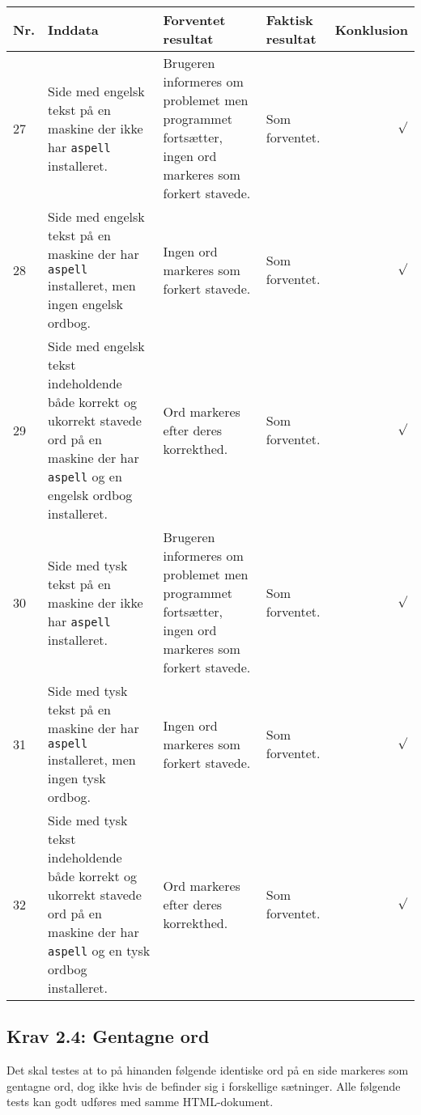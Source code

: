 \documentclass[a4paper,oneside,article]{memoir}
\begin{document}
\begin{landscape}
\begin{longtable}[c]{p{20pt}|p{220pt}|p{130pt}|p{130pt}|r}
\textbf{Nr.} &
\textbf{Inddata} &
\textbf{Forventet resultat} &
\textbf{Faktisk resultat} &
\textbf{Konklusion} \\ \hline

27 &
Side med engelsk tekst på en maskine der ikke har \texttt{aspell}
installeret. &
Brugeren informeres om problemet men programmet fortsætter, ingen ord
markeres som forkert stavede. &
Som forventet. &
$\surd$ \\ \hline

28 &
Side med engelsk tekst på en maskine der har \texttt{aspell}
installeret, men ingen engelsk ordbog. &
Ingen ord markeres som forkert stavede. &
Som forventet. &
$\surd$ \\ \hline

29 &
Side med engelsk tekst indeholdende både korrekt og ukorrekt stavede ord
på en maskine der har \texttt{aspell} og en engelsk ordbog
installeret. &
Ord markeres efter deres korrekthed. &
Som forventet. &
$\surd$ \\ \hline

30 &
Side med tysk tekst på en maskine der ikke har \texttt{aspell}
installeret. &
Brugeren informeres om problemet men programmet fortsætter, ingen ord
markeres som forkert stavede. &
Som forventet. &
$\surd$ \\ \hline

31 &
Side med tysk tekst på en maskine der har \texttt{aspell}
installeret, men ingen tysk ordbog. &
Ingen ord markeres som forkert stavede. &
Som forventet. &
$\surd$ \\ \hline

32 &
Side med tysk tekst indeholdende både korrekt og ukorrekt stavede ord
på en maskine der har \texttt{aspell} og en tysk ordbog installeret. &
Ord markeres efter deres korrekthed. &
Som forventet. &
$\surd$ \\ \hline

\end{longtable}

\subsection{Krav 2.4: Gentagne ord}

Det skal testes at to på hinanden følgende identiske ord på en side
markeres som gentagne ord, dog ikke hvis de befinder sig i forskellige
sætninger. Alle følgende tests kan godt udføres med samme
HTML-dokument.


\end{landscape}
\end{document}

